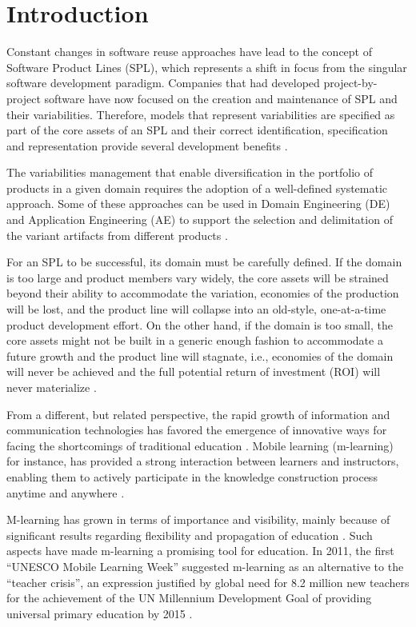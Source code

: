\section{Introduction}

Constant changes in software reuse approaches have lead to the concept of Software Product Lines (SPL), which represents a shift in focus from the singular software development paradigm. Companies that had developed project-by-project software have now focused on the creation and maintenance of SPL and their variabilities. Therefore, models that represent variabilities are specified as part of the core assets of an SPL and their correct identification, specification and representation provide several development benefits \cite{chen11,capilla13}.

The variabilities management that enable diversification in the portfolio of products in a given domain requires the adoption of a well-defined systematic approach. Some of these approaches can be used in Domain Engineering (DE) and Application Engineering (AE) to support the selection and delimitation of the variant artifacts from different products \cite{bockle05,vanderlinden07}.

For an SPL to be successful, its domain must be carefully defined. If the domain is too large and product members vary widely, the core assets will be strained beyond their ability to accommodate the variation, economies of the production will be lost, and the product line will collapse into an old-style, one-at-a-time product development effort. On the other hand, if the domain is too small, the core assets might not be built in a generic enough fashion to accommodate a future growth and the product line will stagnate, i.e., economies of the domain will never be achieved and the full potential return of investment (ROI) will never materialize \cite{bockle05,vanderlinden07}.

From a different, but related perspective, the rapid growth of information and communication technologies has favored the emergence of innovative ways for facing the shortcomings of traditional education \cite{west12}. Mobile learning (m-learning) for instance, has provided a strong interaction between learners and instructors, enabling them to actively participate in the knowledge construction process anytime and anywhere \cite{kukulska05}. 

M-learning has grown in terms of importance and visibility, mainly because of significant results regarding flexibility and propagation of education \cite{kinshuk03,wexler08}. Such aspects have made m-learning a promising tool for education. In 2011, the first ``UNESCO Mobile Learning Week'' suggested m-learning as an alternative to the ``teacher crisis'', an expression justified by global need for 8.2 million new teachers for the achievement of the UN Millennium Development Goal of providing universal primary education by 2015 \cite{west12}.

